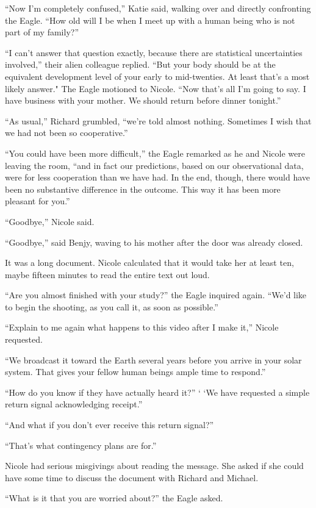 \documentclass[]{article}
\begin{document}
{“Now I’m completely confused,” Katie said, walking over and directly confronting the Eagle.  “How old will I be when I meet up with a human being who is not part of my family?”

“I can’t answer that question exactly, because there are statistical uncertainties involved,” their alien colleague replied.  “But your body should be at the equivalent development level of your early to mid-twenties.  At least that’s a most likely answer."  The Eagle motioned to Nicole.  “Now that’s all I’m going to say.  I have business with your mother.  We should return before dinner tonight.”

“As usual,” Richard grumbled, “we’re told almost nothing.  Sometimes I wish that we had not been so cooperative.”

“You could have been more difficult,” the Eagle remarked as he and Nicole were leaving the room, “and in fact our predictions, based on our observational data, were for less cooperation than we have had.  In the end, though, there would have been no substantive difference in the outcome.  This way it has been more pleasant for you.”

“Goodbye,” Nicole said.

“Goodbye,” said Benjy, waving to his mother after the door was already closed.

It was a long document.  Nicole calculated that it would take her at least ten, maybe fifteen minutes to read the entire text out loud.

“Are you almost finished with your study?” the Eagle inquired again.  “We’d like to begin the shooting, as you call it, as soon as possible.”

“Explain to me again what happens to this video after I make it,” Nicole requested.

“We broadcast it toward the Earth several years before you arrive in your solar system.  That gives your fellow human beings ample time to respond.”

“How do you know if they have actually heard it?” ‘ ‘We have requested a simple return signal acknowledging receipt.”

“And what if you don’t ever receive this return signal?”

“That’s what contingency plans are for.”

Nicole had serious misgivings about reading the message.  She asked if she could have some time to discuss the document with Richard and Michael.

“What is it that you are worried about?” the Eagle asked.

}
\end{document}

